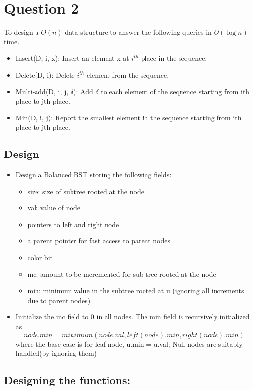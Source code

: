 \documentclass{article}
\begin{document}
\section{Question 2}
To design a $O(n)$ data structure to answer the following queries in $O(\log n)$ time.
\begin{itemize}
	\item Insert(D, i, x): Insert an element x at $i^{th}$ place in the sequence.
	\item Delete(D, i): Delete $i^{th}$ element from the sequence.
	\item Multi-add(D, i, j, $\delta$): Add $\delta$ to each element of the sequence starting from ith place to jth place.
	\item Min(D, i, j): Report the smallest element in the sequence starting from ith place to jth place.
\end{itemize}
\subsection{Design}
\begin{itemize}
	\item Design a Balanced BST storing the following fields:
		\begin{itemize}
			\item size: size of subtree rooted at the node
			\item val: value of node
			\item pointers to left and right node
			\item a parent pointer for fast access to parent nodes
			\item color bit
			\item inc: amount to be incremented for sub-tree rooted at the node
			\item min: minimum value in the subtree rooted at u (ignoring all increments due to parent nodes)
		\end{itemize}
	\item Initialize the inc field to 0 in all nodes. The min field is recursively initialized as
	$$ node.min = minimum(node.val, left(node).min, right(node).min) $$
	where the base case is for leaf node, u.min = u.val;
	Null nodes are suitably handled(by ignoring them)
\end{itemize}
\subsection{Designing the functions:}
\end{document}
